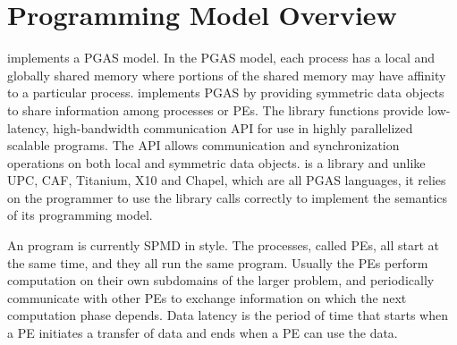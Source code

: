 \section{Programming Model Overview}

\openshmem implements a \ac{PGAS} model. In the \ac{PGAS} model, each process has a local and 
globally shared memory where portions of the shared memory may have affinity to a particular process. 
\openshmem implements \ac{PGAS} by providing symmetric data objects to share information among processes or \ac{PE}s. 
The \openshmem  library functions provide low-latency, high-bandwidth communication \ac{API} for  use  in  highly  parallelized 
scalable programs. The \ac{API} allows communication and synchronization operations on both local and symmetric data objects. 
\openshmem is a library and unlike UPC, CAF, Titanium, X10 and Chapel, which are all
PGAS languages, it relies on the programmer to use the library calls correctly to implement the semantics of its programming model.

An \openshmem program is currently \ac{SPMD} in style. The
\openshmem  processes, called \ac{PE}s, all start at the
same time, and they all run the same program.  Usually the \ac{PE}s  perform
computation on their own subdomains of the larger problem, and periodically 
communicate with other \ac{PE}s to exchange information on which the
next computation phase depends.
Data latency is  the  period  of  time that starts when a \ac{PE} initiates a transfer of data 
and ends when a \ac{PE} can use the data.


